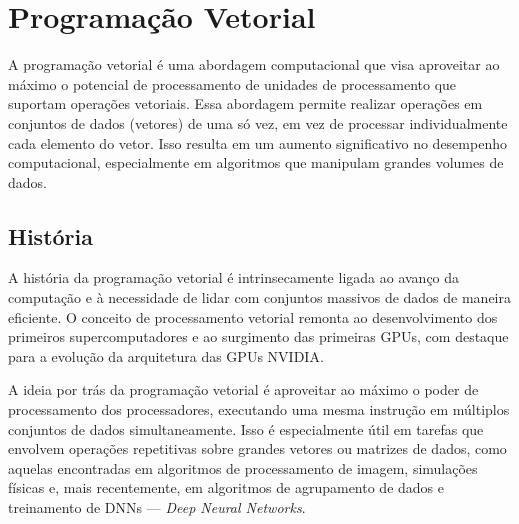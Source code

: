 \documentclass[12pt,
openright, 
oneside, %
a4paper,    %
brazil]{facom-ufu-abntex2}
\begin{document}

\section{Programação Vetorial}




A programação vetorial é uma abordagem computacional que visa aproveitar ao máximo o potencial de processamento de unidades de processamento que suportam operações vetoriais. Essa abordagem permite realizar operações em conjuntos de dados (vetores) de uma só vez, em vez de processar individualmente cada elemento do vetor. Isso resulta em um aumento significativo no desempenho computacional, especialmente em algoritmos que manipulam grandes volumes de dados.



\subsection{História}

A história da programação vetorial é intrinsecamente ligada ao avanço da computação e à necessidade de lidar com conjuntos massivos de dados de maneira eficiente. O conceito de processamento vetorial remonta ao desenvolvimento dos primeiros supercomputadores e ao surgimento das primeiras GPUs, com destaque para a evolução da arquitetura das GPUs NVIDIA.

A ideia por trás da programação vetorial é aproveitar ao máximo o poder de processamento dos processadores, executando uma mesma instrução em múltiplos conjuntos de dados simultaneamente. Isso é especialmente útil em tarefas que envolvem operações repetitivas sobre grandes vetores ou matrizes de dados, como aquelas encontradas em algoritmos de processamento de imagem, simulações físicas e, mais recentemente, em algoritmos de agrupamento de dados e treinamento de DNNs --- \textit{Deep Neural Networks}.
\end{document}
